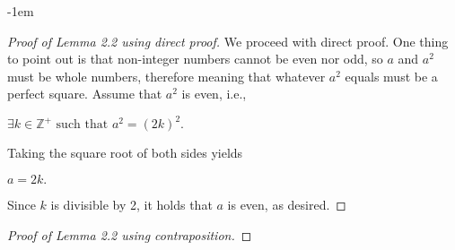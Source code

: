 \documentclass[12pt,a4paper]{article}
\theoremstyle{definition}
\begin{document}
\kern-1em
\color{red}
\begin{proof}[Proof of Lemma 2.2 using direct proof]
We proceed with direct proof. One thing to point out is that non-integer numbers cannot be even nor odd, so $a$ and $a^2$ must be whole numbers, therefore meaning that whatever $a^2$ equals must be a perfect square. Assume that $a^2$ is even, i.e., 
\begin{center}
$\exists k\in\mathbb{Z}^+ \text{ such that } a^2=(2k)^2.$
\end{center}

Taking the square root of both sides yields 

\begin{center}
$a=2k.$
\end{center}

Since $k$ is divisible by 2, it holds that $a$ is even, as desired.
\end{proof}

\begin{proof}[Proof of Lemma 2.2 using contraposition]

\end{proof}
\end{document}
